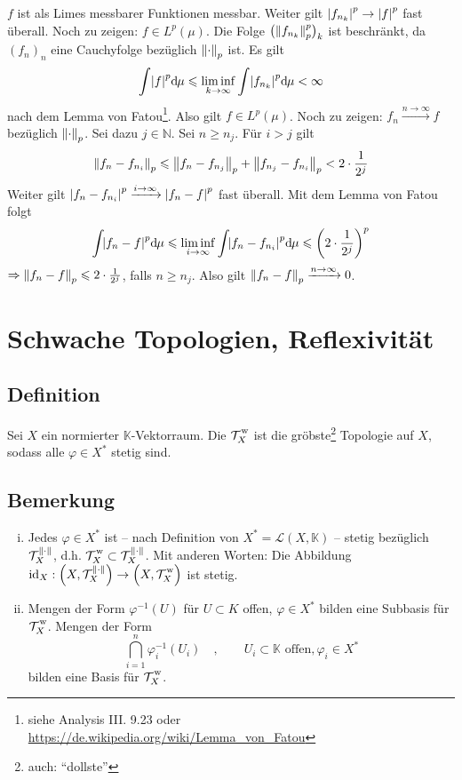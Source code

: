 $f$ ist als Limes messbarer Funktionen messbar. Weiter gilt $\abs*{f_{n_k}}^p \to \abs*{f}^p$ fast überall. 
Noch zu zeigen: $f \in L^p(\mu)$. Die Folge $\enbrace[\big]{\norm[p]{f_{n_k}}^p}_{k}$ ist beschränkt, da $(f_n)_{n}$ eine Cauchyfolge bezüglich $\norm[p]{\cdot}$ ist. Es gilt
\[
	\int \abs*{f}^p \mathd \mu \le \liminf\limits_{k \to \infty} \int \abs*{f_{n_k}}^p \mathd \mu < \infty
\]
nach dem Lemma von Fatou\footnote{siehe Analysis III. 9.23 oder \url{https://de.wikipedia.org/wiki/Lemma_von_Fatou}}. Also gilt $f \in L^p(\mu)$.
Noch zu zeigen: $f_n \xrightarrow{n \to \infty} f$ bezüglich $\norm[p]{\cdot }$. Sei dazu $j \in \mathds{N}$. Sei $n \ge n_j$. Für $i>j$ gilt
\[
	\norm[p]{f_n - f_{n_i}} \le \norm[p]{f_n - f_{n_j}} + \norm[p]{f_{n_j}- f_{n_i}} < 2 \cdot \frac{1}{2^j}    
\]
Weiter gilt $\abs*{f_{n}- f_{n_i}}^p \xrightarrow{i \to \infty} \abs*{f_n -f}^p$ fast überall. Mit dem Lemma von Fatou folgt 
\[
	\int\!\abs*{f_n- f}^p \mathd\mu \le \liminf_{i \to \infty} \int \! \abs*{f_n - f_{n_i}}^p \mathd\mu  \le \enbrace*{2 \cdot \frac{1}{2^j}}^p
\]
$\Rightarrow \norm[p]{f_n -f} \le 2 \cdot \frac{1}{2^j}$, falls $n \ge n_j$. Also gilt $\norm[p]{f_n -f} \xrightarrow{n \to \infty} 0 $. \bewende
\newpage

\section{Schwache Topologien, Reflexivität} %
\label{sec:5}
\subsection[Definition: Schwache Topologie]{Definition} %
\label{sub:51}
Sei $X$ ein normierter $\mathds{K}$-Vektorraum. Die  $\weakT{X}$ ist die gröbste\footnote{auch: \enquote{dollste}} Topologie auf $X$, sodass alle 
$\varphi \in X^*$ stetig sind. 

\subsection[Bemerkungen zu schwachen Topologie]{Bemerkung} %
\label{sub:52}
\begin{enumerate}[(i)]
	\item Jedes $\varphi \in X^*$ ist -- nach Definition von $X^*=\mathcal{L}(X,\mathds{K})$ -- stetig bezüglich $\mathcal{T}^{\norm{\cdot}}_X$, d.h. 
	$\weakT{X} \subset \mathcal{T}_X^{\norm{\cdot}}$. Mit anderen Worten: Die Abbildung 
	$\id_X: \enbrace*{X,\mathcal{T}_X^{\norm{\cdot}}}\to\enbrace[\Big]{X,\weakT{X}}$ ist stetig.
	\item Mengen der Form $\varphi ^{-1}(U)$ für $U \subset K$ offen, $\varphi \in X^*$ bilden eine Subbasis für $\weakT{X}$. Mengen der Form 
	\[
		\bigcap_{i=1}^n \varphi_i ^{-1} (U_i) \quad, \qquad U_i \subset \mathds{K} \text{ offen}, \varphi_i \in X^*
	\]
	bilden eine Basis für $\weakT{X}$.
\end{enumerate}

